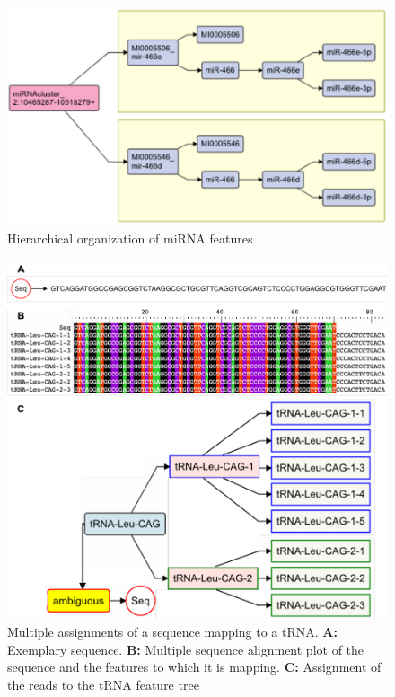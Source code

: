 \documentclass[12pt,twoside]{reedthesis}
\begin{document}
\begin{figure}[h]

{\centering \includegraphics{thesis_files/figure-latex/3f10-1} 

}

\caption{Hierarchical organization of miRNA features}\label{fig:3f10}
\end{figure}

\begin{figure}[h]

{\centering \includegraphics{thesis_files/figure-latex/3f11-1} 

}

\caption{Multiple assignments of a sequence mapping to a tRNA. \textbf{A:} Exemplary sequence. \textbf{B:} Multiple sequence alignment plot of the sequence and the features to which it is mapping. \textbf{C:} Assignment of the reads to the tRNA feature tree}\label{fig:3f11}
\end{figure}
\end{document}
